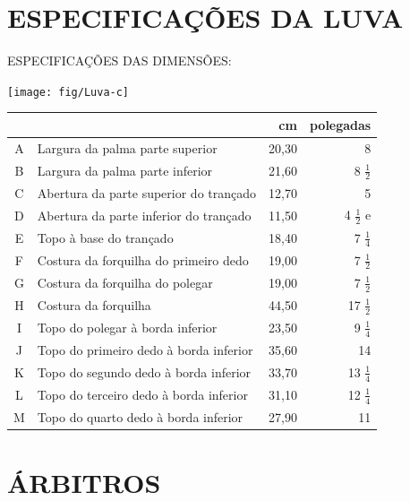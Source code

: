 \chapter{ESPECIFICAÇÕES DA LUVA} \label{chap:Luva}

ESPECIFICAÇÕES DAS DIMENSÕES:

\begin{center}
	\texttt{[image: fig/Luva-c]}


	\begin{tabular}{c |p{90mm}|r|r}
		&&cm& polegadas \\\hline\hline
		A& Largura da palma parte superior &20,30& 8  \\[1.5mm]\hline
		B& Largura da palma parte inferior &21,60& 8 $\frac{1}{2}$ \\[1.5mm]\hline
		C& Abertura da parte superior do trançado &12,70 &5  \\[1.5mm]\hline
		D& Abertura da parte inferior do trançado &11,50 &4 $\frac{1}{2}$  e\\[1.5mm]\hline
		E& Topo à base do trançado &18,40& 7 $\frac{1}{4}$  \\[1.5mm]\hline
		F& Costura da forquilha do primeiro dedo &19,00 &7 $\frac{1}{2}$  \\[1.5mm]\hline
		G& Costura da forquilha do polegar &19,00& 7 $\frac{1}{2}$ \\[1.5mm]\hline
		H& Costura da forquilha &44,50& 17 $\frac{1}{2}$  \\[1.5mm]\hline
		I& Topo do polegar à borda inferior &23,50 &9 $\frac{1}{4}$  \\[1.5mm]\hline
		J& Topo do primeiro dedo à borda inferior &35,60 &14  \\[1.5mm]\hline
		K& Topo do segundo dedo à borda inferior &33,70 &13 $\frac{1}{4}$  \\[1.5mm]\hline
		L& Topo do terceiro dedo à borda inferior& 31,10& 12 $\frac{1}{4}$  \\[1.5mm]\hline
		M& Topo do quarto dedo à borda inferior& 27,90 &11  \\[1.5mm]\hline
	\end{tabular}
\end{center}


\chapter{ÁRBITROS}



